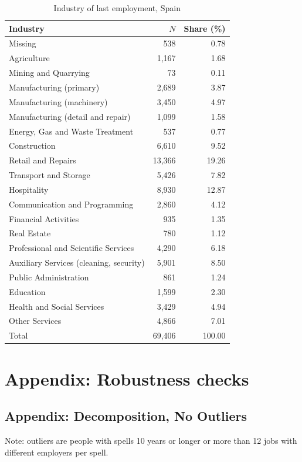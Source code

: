 \documentclass[12pt]{article}
\theoremstyle{definition}
\theoremstyle{remark}
\begin{document}
\begin{appendices}
\begin{table}[httb!]
    \caption{Industry of last employment, Spain}
\begin{tabular}{lrr}
\toprule
Industry & $N$ & Share (\%) \\
\midrule
Missing & 538 & 0.78 \\
Agriculture & 1,167 & 1.68 \\
Mining and Quarrying & 73 & 0.11 \\
Manufacturing (primary) & 2,689 & 3.87 \\
Manufacturing (machinery) & 3,450 & 4.97 \\
Manufacturing (detail and repair) & 1,099 & 1.58 \\
Energy, Gas and Waste Treatment & 537 & 0.77 \\
Construction & 6,610 & 9.52 \\
Retail and Repairs & 13,366 & 19.26 \\
Transport and Storage & 5,426 & 7.82 \\
Hospitality & 8,930 & 12.87 \\
Communication and Programming & 2,860 & 4.12 \\
Financial Activities & 935 & 1.35 \\
Real Estate & 780 & 1.12 \\
Professional and Scientific Services & 4,290 & 6.18 \\
Auxiliary Services (cleaning, security) & 5,901 & 8.50 \\
Public Administration & 861 & 1.24 \\
Education & 1,599 & 2.30 \\
Health and Social Services & 3,429 & 4.94 \\
Other Services & 4,866 & 7.01 \\
\midrule
Total & 69,406 & 100.00 \\
\bottomrule
\end{tabular}
\label{ind_ES}
\end{table}


\clearpage

\section{Appendix: Robustness checks}\label{AppendixRobustness}




\subsection{Appendix: Decomposition, No Outliers}
Note: outliers are people with spells 10 years or longer or more than 12 jobs with different employers per spell.


\end{appendices}
\end{document}
